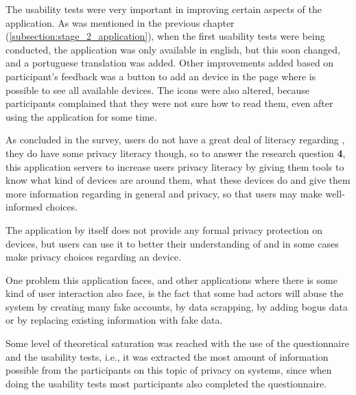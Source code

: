 The usability tests were very important in improving certain aspects of the
application. As was mentioned in the previous chapter (\ref{subsection:stage_2_application}), when the first
usability tests were being conducted, the application was only available
in english, but this soon changed, and a portuguese translation was added.
Other improvements added based on participant's feedback was a button
to add an \hyperlink{\acronym}{\acronym} device in the page where is possible to see all available
devices. The icons were also altered, because participants complained that
they were not sure how to read them, even after using the application for some time.

As concluded in the survey, users do not have a great deal of literacy
regarding \hyperlink{\acronym}{\acronym}, they do have some privacy literacy though, so
to answer the research question \textbf{\hyperlink{\acronym}{\acronym}4}, this application servers to increase users
privacy literacy by giving them tools to know what kind of devices
are around them, what these devices do and give them more information
regarding \hyperlink{\acronym}{\acronym} in general and \hyperlink{\acronym}{\acronym} privacy, so that users may make
well-informed choices.

The application by itself does not provide any formal privacy protection
on \hyperlink{\acronym}{\acronym} devices, but users can use it to better their understanding of \hyperlink{\acronym}{\acronym}
and in some cases make privacy choices regarding an \hyperlink{\acronym}{\acronym} device.

One problem this application faces, and other applications where there is
some kind of user interaction also face, is the fact that some bad
actors will abuse the system by creating many fake accounts, by
data scrapping, by adding bogus data or by replacing existing information
with fake data.

Some level of theoretical saturation \cite{low2019pragmatic} was reached with the use of the questionnaire
and the usability tests, i.e., it was extracted the most amount of information
possible from the participants on this topic of privacy on \hyperlink{\acronym}{\acronym} systems, since
when doing the usability tests most participants also completed the questionnaire.


